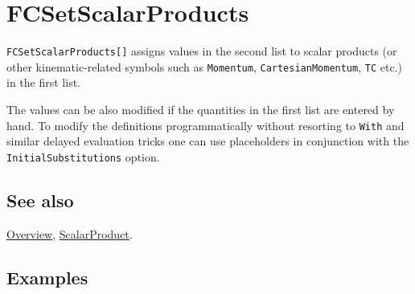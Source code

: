 \documentclass[../FeynCalcManual.tex]{subfiles}
\begin{document}
\hypertarget{fcsetscalarproducts}{
\section{FCSetScalarProducts}\label{fcsetscalarproducts}}

\texttt{FCSetScalarProducts[\allowbreak{}]} assigns values in the second
list to scalar products (or other kinematic-related symbols such as
\texttt{Momentum}, \texttt{CartesianMomentum}, \texttt{TC} etc.) in the
first list.

The values can be also modified if the quantities in the first list are
entered by hand. To modify the definitions programmatically without
resorting to \texttt{With} and similar delayed evaluation tricks one can
use placeholders in conjunction with the \texttt{InitialSubstitutions}
option.

\subsection{See also}

\hyperlink{toc}{Overview}, \hyperlink{scalarproduct}{ScalarProduct}.

\subsection{Examples}

\begin{Shaded}
\begin{Highlighting}[]
\OperatorTok{[]}\NormalTok{; }
 
\OperatorTok{[\{}\OperatorTok{[}\OperatorTok{],}\OperatorTok{[}\OperatorTok{],}\OperatorTok{[}\OperatorTok{,}\OperatorTok{]\},} \OperatorTok{\{}\OperatorTok{,}\OperatorTok{,}\OperatorTok{\}]}\NormalTok{;}
\end{Highlighting}
\end{Shaded}

\begin{Shaded}
\begin{Highlighting}[]
\OperatorTok{\{}\OperatorTok{[}\OperatorTok{],}\OperatorTok{[}\OperatorTok{],}\OperatorTok{[}\OperatorTok{,}\OperatorTok{]\}}
\end{Highlighting}
\end{Shaded}
\end{document}
